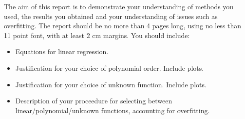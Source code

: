 \documentclass[10pt]{article}
\begin{document}
The aim of this report is to demonstrate your understanding of methods you used, the results you obtained and your understanding of issues such as overfitting.
The report should be no more than 4 pages long, using no less than 11 point font, with at least 2 cm margins.
You should include:
\begin{itemize}
  \item Equations for linear regression.
  \item Justification for your choice of polynomial order.  Include plots.
  \item Justification for your choice of unknown function.  Include plots.
  \item Description of your proceedure for selecting between linear/polynomial/unknown functions, accounting for overfitting.
\end{itemize}

%
%
%
%
\end{document}
